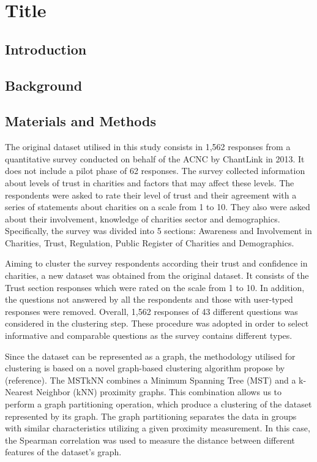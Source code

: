 \documentclass{article}
\begin{document}
\section{Title}

\subsection{Introduction}

\subsection{Background}

\subsection{Materials and Methods}


The original dataset utilised in this study consists in 1,562 responses from a
quantitative survey conducted on behalf of the ACNC by ChantLink in 2013. It
does not include a pilot phase of 62 responses. The survey collected information
about levels of trust in charities and factors that may affect these levels. The
respondents were asked to rate their level of trust and their agreement with a
series of statements about charities on a scale from 1 to 10. They also were
asked about their involvement, knowledge of charities sector and demographics.
Specifically, the survey was divided into 5 sections: Awareness and Involvement
in Charities, Trust, Regulation, Public Register of Charities and Demographics.

Aiming to cluster the survey respondents according their trust and confidence in
charities, a new dataset was obtained from the original dataset. It consists of
the Trust section responses which were rated on the scale from 1 to 10. In
addition, the questions not answered by all the respondents and those with
user-typed responses were removed. Overall, 1,562 responses of 43 different
questions was considered in the clustering step. These procedure was adopted in
order to select informative and comparable questions as the survey contains
different types.

Since the dataset can be represented as a graph, the methodology utilised for
clustering is based on a novel graph-based clustering algorithm propose by
(reference). The MSTkNN combines a Minimum Spanning Tree (MST) and a k-Nearest
Neighbor (kNN) proximity graphs. This combination allows us to perform a graph
partitioning operation, which produce a clustering of the dataset represented by
its graph. The graph partitioning separates the data in groups with similar
characteristics utilizing a given proximity measurement. In this case, the
Spearman correlation was used to measure the distance between different features
of the dataset's graph.
\end{document}

